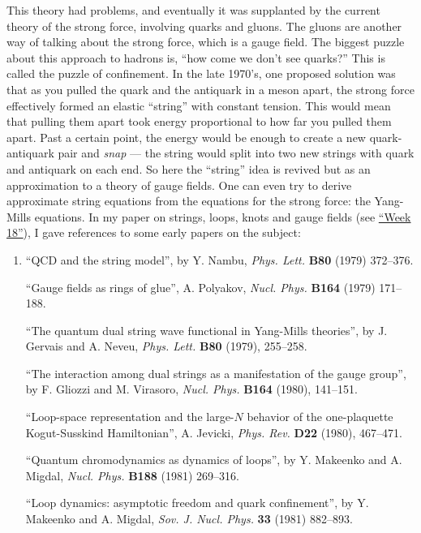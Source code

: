\documentclass{article}
\begin{document}
This theory had problems, and eventually it was supplanted by the
current theory of the strong force, involving quarks and gluons. The
gluons are another way of talking about the strong force, which is a
gauge field. The biggest puzzle about this approach to hadrons is, ``how
come we don't see quarks?'' This is called the puzzle of confinement. In
the late 1970's, one proposed solution was that as you pulled the quark
and the antiquark in a meson apart, the strong force effectively formed
an elastic ``string'' with constant tension. This would mean that
pulling them apart took energy proportional to how far you pulled them
apart. Past a certain point, the energy would be enough to create a new
quark-antiquark pair and \emph{snap} --- the string would split into two
new strings with quark and antiquark on each end. So here the ``string''
idea is revived but as an approximation to a theory of gauge fields. One
can even try to derive approximate string equations from the equations
for the strong force: the Yang-Mills equations. In my paper on strings,
loops, knots and gauge fields (see \protect\hyperlink{week18}{``Week
18''}), I gave references to some early papers on the subject:

\begin{enumerate}
\def\labelenumi{\arabic{enumi})}
\item
  ``QCD and the string model'', by Y. Nambu, \emph{Phys. Lett.}
  \textbf{B80} (1979) 372--376.

  ``Gauge fields as rings of glue'', A. Polyakov, \emph{Nucl. Phys.}
  \textbf{B164} (1979) 171--188.

  ``The quantum dual string wave functional in Yang-Mills theories'', by
  J. Gervais and A. Neveu, \emph{Phys. Lett.} \textbf{B80} (1979),
  255--258.

  ``The interaction among dual strings as a manifestation of the gauge
  group'', by F. Gliozzi and M. Virasoro, \emph{Nucl. Phys.}
  \textbf{B164} (1980), 141--151.

  ``Loop-space representation and the large-\(N\) behavior of the
  one-plaquette Kogut-Susskind Hamiltonian'', A. Jevicki, \emph{Phys.
  Rev.} \textbf{D22} (1980), 467--471.

  ``Quantum chromodynamics as dynamics of loops'', by Y. Makeenko and A.
  Migdal, \emph{Nucl. Phys.} \textbf{B188} (1981) 269--316.

  ``Loop dynamics: asymptotic freedom and quark confinement'', by Y.
  Makeenko and A. Migdal, \emph{Sov. J. Nucl. Phys.} \textbf{33} (1981)
  882--893.
\end{enumerate}
\end{document}
